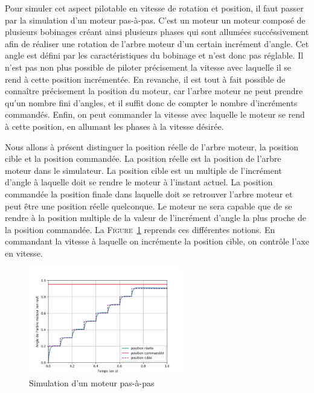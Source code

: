 				Pour simuler cet aspect pilotable en vitesse de rotation et position, il faut passer par la simulation d'un moteur pas-à-pas. C'est un moteur un moteur composé de plusieurs bobinages créant ainsi plusieurs phases qui sont allumées succéssivement afin de réaliser une rotation de l'arbre moteur d'un certain incrément d'angle. Cet angle est défini par les caractéristiques du bobinage et n'est donc pas réglable. Il n'est pas non plus possible de piloter précisement la vitesse avec laquelle il se rend à cette position incrémentée. En revanche, il est tout à fait possible de connaître précisement la position du moteur, car l'arbre moteur ne peut prendre qu'un nombre fini d'angles, et il suffit donc de compter le nombre d'incréments commandés. Enfin, on peut commander la vitesse avec laquelle le moteur se rend à cette position, en allumant les phases à la vitesse désirée.

				Nous allons à présent distinguer la position réelle de l'arbre moteur, la position cible et la position commandée. La position réelle est la position de l'arbre moteur dans le simulateur. La position cible est un multiple de l'incrément d'angle à laquelle doit se rendre le moteur à l'instant actuel. La position commandée la position finale dans laquelle doit se retrouver l'arbre moteur et peut être une position réelle quelconque. Le moteur ne sera capable que de se rendre à la position multiple de la valeur de l'incrément d'angle la plus proche de la position commandée. La \textsc{Figure}~\ref{fig:tilt_position} reprends ces différentes notions. En commandant la vitesse à laquelle on incrémente la position cible, on contrôle l'axe en vitesse.

				\begin{figure}[!htb]
					\centering
					\includegraphics[width=0.6\textwidth]{imgs/stepper_motor.png}
					\caption{Simulation d'un moteur pas-à-pas}
					\label{fig:tilt_position}
				\end{figure}
				
